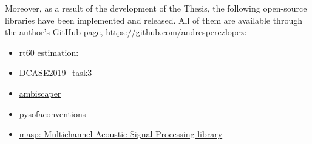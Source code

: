 Moreover, as a result of the development of the Thesis, the following open-source libraries have been implemented and released. All of them are available through the author's GitHub page, \url{https://github.com/andresperezlopez}: 

\begin{itemize}

	\item rt60 estimation: 
	
	\item \href{https://github.com/andresperezlopez/DCASE2019_task3}{DCASE2019\_task3}

	\item \href{https://github.com/andresperezlopez/ambiscaper}{ambiscaper} 
	
	\item \href{https://github.com/andresperezlopez/pysofaconventions}{pysofaconventions}
	
	\item \href{https://github.com/andresperezlopez/masp}{masp: Multichannel Acoustic Signal Processing library}
	
\end{itemize}



